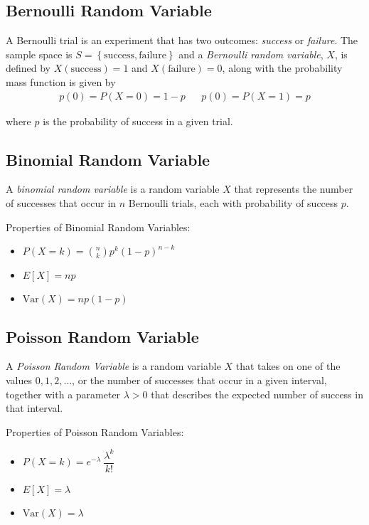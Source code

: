 \documentclass[10pt]{article}
\begin{document}
		\subsection*{Bernoulli  Random Variable}
		
		A Bernoulli trial is an experiment that has two outcomes: \emph{success} or \emph{failure}. The sample space is $S=\left\{ \text{success}, \text{failure}\right\}$ and a \emph{Bernoulli random variable}, $X$, is defined by $X(\text{success})=1$ and $X(\text{failure}) = 0$, along with the probability mass function is given by
		\begin{align*}
			p(0) = P(X=0) = 1 - p  && p(0) = P(X=1) = p
		\end{align*}
		
		where $p$ is the probability of success in a given trial.
		\subsection*{Binomial Random Variable}
		A \emph{binomial random variable} is a random variable $X$ that represents the number of successes that occur in $n$ Bernoulli trials, each with probability of success $p$.
		
		Properties of Binomial Random Variables:
		\begin{multicols}{3}
			\begin{itemize}
				\item $P(X=k) = {n \choose k} p^{k} (1-p)^{n-k}$
				\item $E[X] = np$
				\item $\text{Var}(X)= np(1-p) $
			\end{itemize}
		\end{multicols}
		
		
		\subsection*{Poisson Random Variable}
		
		A \emph{Poisson Random Variable} is a random variable $X$ that takes on one of the values $0, 1, 2, \ldots$, or the number of successes that occur in a given interval, together with a parameter $\lambda > 0$ that describes the expected number of success in that interval.
		
		Properties of Poisson Random Variables:
		
		\begin{multicols}{3}
			\begin{itemize}
				\item $P(X=k) = e^{-\lambda} \: \dfrac{\lambda^k}{k!}$
				\item $E[X] = \lambda$
				\item $\text{Var}(X) = \lambda$
			\end{itemize}
		\end{multicols}
	
\end{document}
